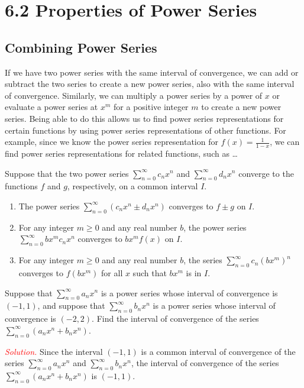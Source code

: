 \documentclass{report}
\begin{document}
    \pagebreak \bigbreak \noindent 
    \section*{6.2 Properties of Power Series}
    \bigbreak \noindent 
    \subsection*{Combining Power Series}
    \bigbreak \noindent 
    If we have two power series with the same interval of convergence, we can add or subtract the two series to create a new power series, also with the same interval of convergence. Similarly, we can multiply a power series by a power of \( x \) or evaluate a power series at \( x^m \) for a positive integer \( m \) to create a new power series. Being able to do this allows us to find power series representations for certain functions by using power series representations of other functions. For example, since we know the power series representation for \( f(x) = \frac{1}{1-x} \), we can find power series representations for related functions, such as \ldots

    \bigbreak \noindent 

    \begin{thrmm}
        Suppose that the two power series \(\sum_{n=0}^{\infty} c_n x^n\) and \(\sum_{n=0}^{\infty} d_n x^n\) converge to the functions \(f\) and \(g\), respectively, on a common interval \(I\).
    \begin{enumerate}[label=(\roman*)]
        \item The power series \(\sum_{n=0}^{\infty} (c_n x^n \pm d_n x^n)\) converges to \(f \pm g\) on \(I\).
        \item For any integer \(m \geq 0\) and any real number \(b\), the power series \(\sum_{n=0}^{\infty} b x^m c_n x^n\) converges to \(b x^m f(x)\) on \(I\).
        \item For any integer \(m \geq 0\) and any real number \(b\), the series \(\sum_{n=0}^{\infty} c_n (b x^m)^n\) converges to \(f(b x^m)\) for all \(x\) such that \(b x^m\) is in \(I\).
    \end{enumerate}
    \end{thrmm}

    \bigbreak \noindent 
    \begin{exm}
       Suppose that \(\sum_{n=0}^{\infty} a_n x^n\) is a power series whose interval of convergence is \((-1, 1)\), and suppose that \(\sum_{n=0}^{\infty} b_n x^n\) is a power series whose interval of convergence is \((-2, 2)\).
       \bigbreak \noindent 
       Find the interval of convergence of the series \(\sum_{n=0}^{\infty} (a_n x^n + b_n x^n)\).
    \end{exm}
    \bigbreak \noindent 
    \textcolor{red}{\textit{Solution.}} Since the interval \((-1, 1)\) is a common interval of convergence of the series \(\sum_{n=0}^{\infty} a_n x^n\) and \(\sum_{n=0}^{\infty} b_n x^n\), the interval of convergence of the series \(\sum_{n=0}^{\infty} (a_n x^n + b_n x^n)\) is \((-1, 1)\).
\end{document}
